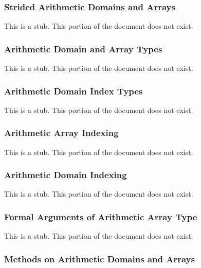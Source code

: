 \subsubsection{Strided Arithmetic Domains and Arrays}
\label{Strided_Arithmetic_Domains_and_Arrays}

This is a stub.  This portion of the document does not exist.

\subsubsection{Arithmetic Domain and Array Types}
\label{Arithmetic_Domain_and_Array_Types}

This is a stub.  This portion of the document does not exist.

\subsubsection{Arithmetic Domain Index Types}
\label{Arithmetic_Domain_Index_Types}

This is a stub.  This portion of the document does not exist.

\subsubsection{Arithmetic Array Indexing}
\label{Arithmetic_Array_Indexing}

This is a stub.  This portion of the document does not exist.

\subsubsection{Arithmetic Domain Indexing}
\label{Arithmetic_Domain_Indexing}

This is a stub.  This portion of the document does not exist.

\subsubsection{Formal Arguments of Arithmetic Array Type}
\label{Formal_Arguments_of_Arithmetic_Array_Type}

This is a stub.  This portion of the document does not exist.

\subsubsection{Methods on Arithmetic Domains and Arrays}
\label{Methods_on_Arithmetic_Domains_and_Arrays}


